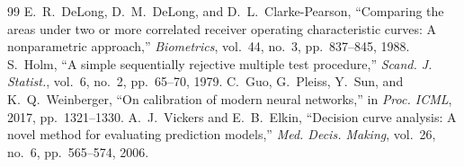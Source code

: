 \documentclass[journal]{IEEEtran}
\begin{document}
\begin{thebibliography}{99}
 E.~R.~DeLong, D.~M.~DeLong, and D.~L.~Clarke-Pearson, ``Comparing the areas under two or more correlated receiver operating characteristic curves: A nonparametric approach,'' \textit{Biometrics}, vol.~44, no.~3, pp.~837--845, 1988.
 S.~Holm, ``A simple sequentially rejective multiple test procedure,'' \textit{Scand. J. Statist.}, vol.~6, no.~2, pp.~65--70, 1979.
 C.~Guo, G.~Pleiss, Y.~Sun, and K.~Q.~Weinberger, ``On calibration of modern neural networks,'' in \textit{Proc. ICML}, 2017, pp.~1321--1330.
 A.~J.~Vickers and E.~B.~Elkin, ``Decision curve analysis: A novel method for evaluating prediction models,'' \textit{Med. Decis. Making}, vol.~26, no.~6, pp.~565--574, 2006.
\end{thebibliography}
\end{document}
